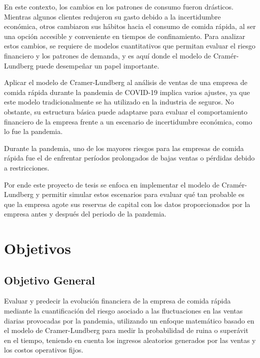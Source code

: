 \documentclass[
  us-letterpaper,
]{scrreprt}
\theoremstyle{plain}
\theoremstyle{plain}
\theoremstyle{definition}
\theoremstyle{remark}
\begin{document}
En este contexto, los cambios en los patrones de consumo fueron
drásticos. Mientras algunos clientes redujeron su gasto debido a la
incertidumbre económica, otros cambiaron sus hábitos hacia el consumo de
comida rápida, al ser una opción accesible y conveniente en tiempos de
confinamiento. Para analizar estos cambios, se requiere de modelos
cuantitativos que permitan evaluar el riesgo financiero y los patrones
de demanda, y es aquí donde el modelo de Cramér-Lundberg puede
desempeñar un papel importante.

Aplicar el modelo de Cramer-Lundberg al análisis de ventas de una
empresa de comida rápida durante la pandemia de COVID-19 implica varios
ajustes, ya que este modelo tradicionalmente se ha utilizado en la
industria de seguros. No obstante, su estructura básica puede adaptarse
para evaluar el comportamiento financiero de la empresa frente a un
escenario de incertidumbre económica, como lo fue la pandemia.

Durante la pandemia, uno de los mayores riesgos para las empresas de
comida rápida fue el de enfrentar períodos prolongados de bajas ventas o
pérdidas debido a restricciones.

Por ende este proyecto de tesis se enfoca en implementar el modelo de
Cramér-Lundberg y permitir simular estos escenarios para evaluar qué tan
probable es que la empresa agote sus reservas de capital con los datos
proporcionados por la empresa antes y después del periodo de la
pandemia.


\chapter*{Objetivos}\label{objetivos}


\section*{Objetivo General}\label{objetivo-general}


Evaluar y predecir la evolución financiera de la empresa de comida
rápida mediante la cuantificación del riesgo asociado a las
fluctuaciones en las ventas diarias provocadas por la pandemia,
utilizando un enfoque matemático basado en el modelo de Cramer-Lundberg
para medir la probabilidad de ruina o superávit en el tiempo, teniendo
en cuenta los ingresos aleatorios generados por las ventas y los costos
operativos fijos.
\end{document}
